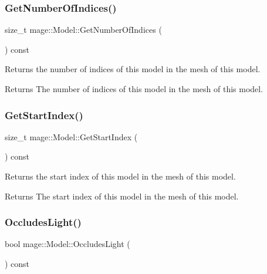 \subsubsection{\texorpdfstring{Get\+Number\+Of\+Indices()}{GetNumberOfIndices()}}
{\footnotesize\ttfamily size\+\_\+t mage\+::\+Model\+::\+Get\+Number\+Of\+Indices (\begin{DoxyParamCaption}{ }\end{DoxyParamCaption}) const\hspace{0.3cm}{\ttfamily [noexcept]}}

Returns the number of indices of this model in the mesh of this model.

\begin{DoxyReturn}{Returns}
The number of indices of this model in the mesh of this model. 
\end{DoxyReturn}
\hypertarget{classmage_1_1_model_a876fcfe369f12e2d7edb6b533dd06252}{}\label{classmage_1_1_model_a876fcfe369f12e2d7edb6b533dd06252} 
\subsubsection{\texorpdfstring{Get\+Start\+Index()}{GetStartIndex()}}
{\footnotesize\ttfamily size\+\_\+t mage\+::\+Model\+::\+Get\+Start\+Index (\begin{DoxyParamCaption}{ }\end{DoxyParamCaption}) const\hspace{0.3cm}{\ttfamily [noexcept]}}

Returns the start index of this model in the mesh of this model.

\begin{DoxyReturn}{Returns}
The start index of this model in the mesh of this model. 
\end{DoxyReturn}
\hypertarget{classmage_1_1_model_a2ab5542819b80d58f349128a6c0194b5}{}\label{classmage_1_1_model_a2ab5542819b80d58f349128a6c0194b5} 
\subsubsection{\texorpdfstring{Occludes\+Light()}{OccludesLight()}}
{\footnotesize\ttfamily bool mage\+::\+Model\+::\+Occludes\+Light (\begin{DoxyParamCaption}{ }\end{DoxyParamCaption}) const\hspace{0.3cm}{\ttfamily [noexcept]}}

